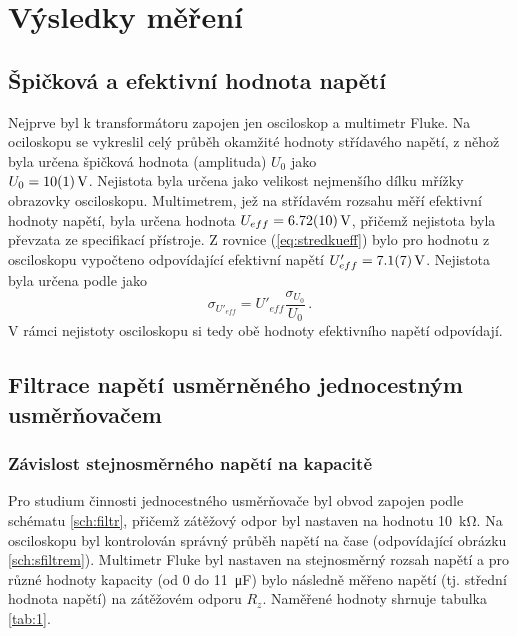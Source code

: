 \documentclass{../concepts/prepareprotokol} %
\begin{document}
\section{Výsledky měření}

\subsection{Špičková a efektivní hodnota napětí}

Nejprve byl k transformátoru zapojen jen osciloskop a multimetr Fluke. Na ociloskopu se vykreslil celý průběh okamžité hodnoty střídavého napětí, z něhož byla určena špičková hodnota (amplituda) $U_0$ jako \\ $U_0 = \qty{10 \pm 1}{V}$. Nejistota byla určena jako velikost nejmenšího dílku mřížky obrazovky osciloskopu. Multimetrem, jež na střídavém rozsahu měří efektivní hodnoty napětí, byla určena hodnota $U_{eff} = \qty{6.72 \pm 0.10}{V}$, přičemž nejistota byla převzata ze specifikací přístroje. Z rovnice (\ref{eq:stredkueff}) bylo pro hodnotu z osciloskopu vypočteno odpovídající efektivní napětí $U'_{eff} = \qty{7.1 \pm 0.7}{V}$. Nejistota byla určena podle \cite{englich} jako
\begin{equation}
    \sigma_{U'_{eff}} = U'_{eff} \frac{\sigma_{U_0}}{U_0} \, .    
\end{equation}
V rámci nejistoty osciloskopu si tedy obě hodnoty efektivního napětí odpovídají.

\subsection{Filtrace napětí usměrněného jednocestným usměrňovačem}

\subsubsection{Závislost stejnosměrného napětí na kapacitě}

Pro studium činnosti jednocestného usměrňovače byl obvod zapojen podle schématu \ref{sch:filtr}, přičemž zátěžový odpor byl nastaven na hodnotu \qty{10}{\kilo\ohm}. Na osciloskopu byl kontrolován správný průběh napětí na čase (odpovídající obrázku \ref{sch:sfiltrem}). Multimetr Fluke byl nastaven na stejnosměrný rozsah napětí a pro různé hodnoty kapacity (od 0 do \qty{11}{\micro\farad}) bylo následně měřeno napětí (tj. střední hodnota napětí) na zátěžovém odporu $R_z$. Naměřené hodnoty shrnuje tabulka \ref{tab:1}.
\end{document}
